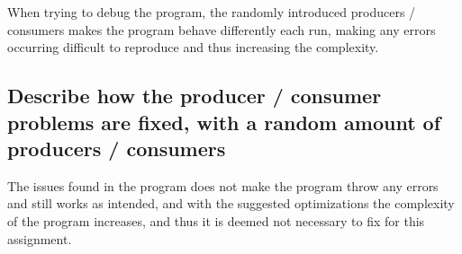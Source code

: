 When trying to debug the program, the randomly introduced producers / consumers makes the program behave differently each run, making any errors occurring difficult to reproduce and thus increasing the complexity.



\subsection{Describe how the producer / consumer problems are fixed, with a random amount of producers / consumers}
The issues found in the program does not make the program throw any errors and still works as intended, and with the suggested optimizations the complexity of the program increases, and thus it is deemed not necessary to fix for this assignment.

